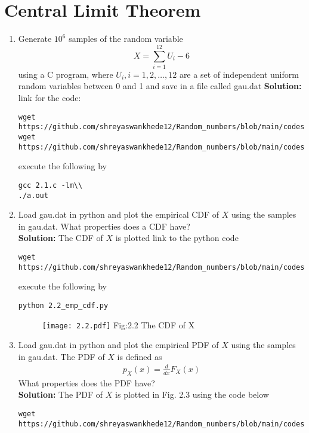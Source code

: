 \documentclass[journal,12pt,twocolumn]{IEEEtran}
\renewcommand\thesection{\arabic{section}}
\theoremstyle{remark}
\newcommand{\solution}{\noindent \textbf{Solution: }}
\numberwithin{equation}{section}
\begin{document}
\section{Central Limit Theorem}
%
\begin{enumerate}[label=\thesection.\arabic*
,ref=\thesection.\theenumi]
%
\item
Generate $10^6$ samples of the random variable
%
\begin{equation}
X = \sum_{i=1}^{12}U_i -6
\end{equation}
%
using a C program, where $U_i, i = 1,2,\dots, 12$ are  a set of independent uniform random variables between 0 and 1
and save in a file called gau.dat
\solution link for the code:
\begin{lstlisting}
wget https://github.com/shreyaswankhede12/Random_numbers/blob/main/codes/2.1.c\\
wget https://github.com/shreyaswankhede12/Random_numbers/blob/main/codes/coeffs.h
\end{lstlisting}
execute the following by
\begin{lstlisting}
gcc 2.1.c -lm\\
./a.out
\end{lstlisting}
\item
Load gau.dat in python and plot the empirical CDF of $X$ using the samples in gau.dat. What properties does a CDF have?
\\
\solution The CDF of $X$ is plotted 
link to the python code
\begin{lstlisting}
wget https://github.com/shreyaswankhede12/Random_numbers/blob/main/codes/2.2_emp_cdf.py
\end{lstlisting}
execute the following by
\begin{lstlisting}
python 2.2_emp_cdf.py
\end{lstlisting}
\begin{figure}
\centering
\texttt{[image: 2.2.pdf]}
Fig:2.2 The CDF of X
\end{figure}
\item
Load gau.dat in python and plot the empirical PDF of $X$ using the samples in gau.dat. The PDF of $X$ is defined as
\begin{align}
p_{X}(x) = \frac{d}{dx}F_{X}(x)
\end{align}
What properties does the PDF have?
\\
\solution The PDF of $X$ is plotted in Fig. 2.3 using the code below
\begin{lstlisting}
wget https://github.com/shreyaswankhede12/Random_numbers/blob/main/codes/2.3_emp_pdf.py

\end{lstlisting}
\end{enumerate}
\end{document}
